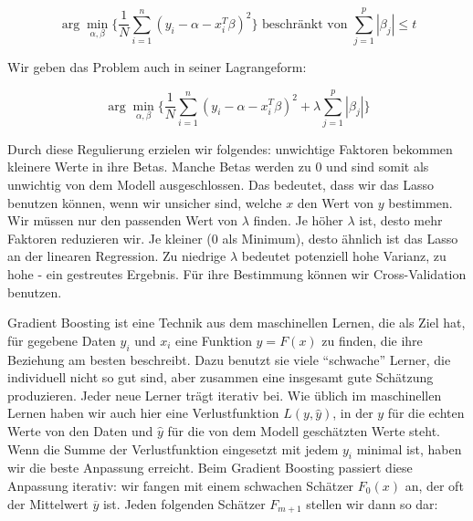 \documentclass[12pt,a4paper,twoside]{scrartcl}
\numberwithin{equation}{section}
\newcounter{subsubsubsection}[subsubsection]
\begin{document}
\begin{equation}\label{eq:2.23}
	\arg\min_{\alpha, \beta} \bigg\{ \frac{1}{N}\sum_{i=1}^{n} (y_i - \alpha - x_i^T\beta)^2 \bigg\} \text{ beschränkt von } \sum_{j=1}^{p} |\beta_j| \leq t
\end{equation}  

\noindent
Wir geben das Problem auch in seiner Lagrangeform:\par 

\begin{equation}\label{eq:2.24}
	 \arg\min_{\alpha, \beta} \bigg\{ \frac{1}{N}\sum_{i=1}^{n} (y_i - \alpha - x_i^T\beta)^2 + \lambda  \sum_{j=1}^{p} |\beta_j| \bigg\}
\end{equation} 

\noindent
Durch diese Regulierung erzielen wir folgendes: unwichtige Faktoren bekommen kleinere Werte in ihre Betas. Manche Betas werden zu $0$ und sind somit als unwichtig von dem Modell ausgeschlossen. Das bedeutet, dass wir das Lasso benutzen können, wenn wir unsicher sind, welche $x$ den Wert von $y$ bestimmen\cite{tibshirani1996regression}. Wir müssen nur den passenden Wert von $\lambda$ finden. Je höher $\lambda$ ist, desto mehr Faktoren reduzieren wir. Je kleiner ($0$ als Minimum), desto ähnlich ist das Lasso an der linearen Regression.  Zu niedrige $\lambda$ bedeutet potenziell hohe Varianz, zu hohe - ein gestreutes Ergebnis. Für ihre Bestimmung können wir Cross-Validation benutzen\cite{tibshirani1996regression}.\par 

\label{subsubsubsec:gradientBoosting}

Gradient Boosting ist eine Technik aus dem maschinellen Lernen, die als Ziel hat, für gegebene Daten $y_i$ und $x_i$ eine Funktion $y=F(x)$ zu finden, die ihre Beziehung am besten beschreibt. Dazu benutzt sie viele \enquote{schwache} Lerner, die individuell nicht so gut sind, aber zusammen eine insgesamt gute Schätzung produzieren. Jeder neue Lerner trägt iterativ bei. Wie üblich im maschinellen Lernen haben wir auch hier eine Verlustfunktion $L(y,\hat y)$, in der $y$ für die echten Werte von den Daten und $\hat y$ für die von dem Modell geschätzten Werte steht. Wenn die Summe der Verlustfunktion eingesetzt mit jedem $y_i$ minimal ist, haben wir die beste Anpassung erreicht. Beim Gradient Boosting passiert diese Anpassung iterativ: wir fangen mit einem schwachen Schätzer $F_0(x)$ an, der oft der Mittelwert $\overline{y}$ ist\cite{gradientBoost}. Jeden folgenden Schätzer $F_{m+1}$ stellen wir dann so dar:\par
\end{document}
